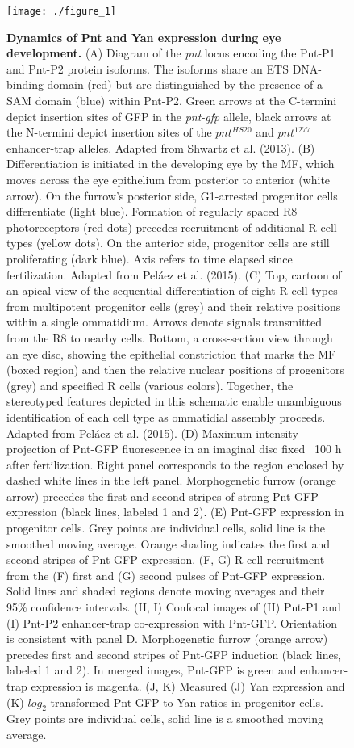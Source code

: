 

\begin{figure}[h]
\centering
\texttt{[image: ./figure\_1]}
\caption[Dynamics of Pnt and Yan expression during eye development.]{\textbf{Dynamics of Pnt and Yan expression during eye development.} (A) Diagram of the \textit{pnt} locus encoding the Pnt-P1 and Pnt-P2 protein isoforms. The isoforms share an ETS DNA-binding domain (red) but are distinguished by the presence of a SAM domain (blue) within Pnt-P2. Green arrows at the C-termini depict insertion sites of GFP in the \textit{pnt-gfp} allele, black arrows at the N-termini depict insertion sites of the $pnt^{HS20}$ and $pnt^{1277}$ enhancer-trap alleles. Adapted from Shwartz et al. (2013). (B) Differentiation is initiated in the developing eye by the MF, which moves across the eye epithelium from posterior to anterior (white arrow). On the furrow's posterior side, G1-arrested progenitor cells differentiate (light blue). Formation of regularly spaced R8 photoreceptors (red dots) precedes recruitment of additional R cell types (yellow dots). On the anterior side, progenitor cells are still proliferating (dark blue). Axis refers to time elapsed since fertilization. Adapted from Peláez et al. (2015). (C) Top, cartoon of an apical view of the sequential differentiation of eight R cell types from multipotent progenitor cells (grey) and their relative positions within a single ommatidium. Arrows denote signals transmitted from the R8 to nearby cells. Bottom, a cross-section view through an eye disc, showing the epithelial constriction that marks the MF (boxed region) and then the relative nuclear positions of progenitors (grey) and specified R cells (various colors). Together, the stereotyped features depicted in this schematic enable unambiguous identification of each cell type as ommatidial assembly proceeds. Adapted from Peláez et al. (2015). (D) Maximum intensity projection of Pnt-GFP fluorescence in an imaginal disc fixed ~100 h after fertilization. Right panel corresponds to the region enclosed by dashed white lines in the left panel. Morphogenetic furrow (orange arrow) precedes the first and second stripes of strong Pnt-GFP expression (black lines, labeled 1 and 2). (E) Pnt-GFP expression in progenitor cells. Grey points are individual cells, solid line is the smoothed moving average. Orange shading indicates the first and second stripes of Pnt-GFP expression. (F, G) R cell recruitment from the (F) first and (G) second pulses of Pnt-GFP expression. Solid lines and shaded regions denote moving averages and their 95\% confidence intervals. (H, I) Confocal images of (H) Pnt-P1 and (I) Pnt-P2 enhancer-trap co-expression with Pnt-GFP. Orientation is consistent with panel D. Morphogenetic furrow (orange arrow) precedes first and second stripes of Pnt-GFP induction (black lines, labeled 1 and 2). In merged images, Pnt-GFP is green and enhancer-trap expression is magenta. (J, K) Measured (J) Yan expression and (K) $log_2$-transformed Pnt-GFP to Yan ratios in progenitor cells. Grey points are individual cells, solid line is a smoothed moving average.}
\label{fig:ch2:fig1}
\end{figure}

